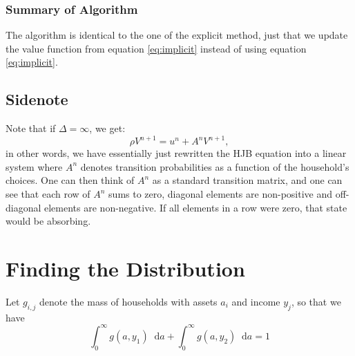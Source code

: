 \documentclass[12pt]{article}
\DeclareMathOperator{\1}{\mathbbm{1}}
\newcommand*\diff{\mathop{}\!\mathrm{d}}
\begin{document}
\subsubsection{Summary of Algorithm}
The algorithm is identical to the one of the explicit method, just that we update the value function from equation \eqref{eq:implicit} instead of using equation \ref{eq:implicit}.



\subsection{Sidenote}
Note that if $\Delta = \infty$, we get:
\begin{equation}
\rho V^{n+1} = u^n + A^n V^{n+1},
\end{equation}
in other words, we have essentially just rewritten the HJB equation into a linear system where $A^n$ denotes transition probabilities as a function of the household's choices. One can then think of $A^n$ as a standard transition matrix, and one can see that each row of $A^n$ sums to zero, diagonal elements are non-positive and off-diagonal elements are non-negative. If all elements in a row were zero, that state would be absorbing.


\section{Finding the Distribution}
Let $g_{i,j}$ denote the mass of households with assets $a_i$ and income $y_j$, so that we have
\begin{equation}
\int_0^\infty g(a,y_1)\diff a + \int_0^\infty g(a,y_2)\diff a =1
\end{equation}
\end{document}
